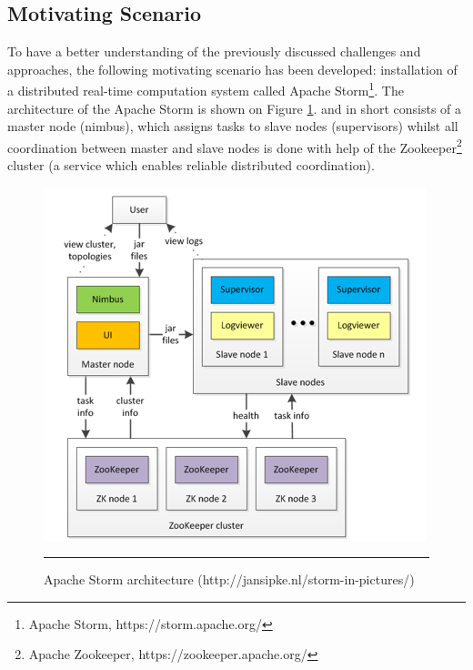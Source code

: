
\subsection{Motivating Scenario}

\noindent To have a better understanding of the previously discussed challenges and approaches, the following motivating scenario has been developed: installation of a distributed real-time computation system called Apache Storm\footnote{ Apache Storm, $  $https://storm.apache.org/}. The architecture of the Apache Storm is shown on Figure \ref{fig:Storm}. and in short consists of a master node (nimbus), which assigns tasks to slave nodes (supervisors) whilst all coordination between master and slave nodes is done with help of the Zookeeper\footnote{ Apache Zookeeper, $  $https://zookeeper.apache.org/} cluster (a service which enables reliable distributed coordination). 

\noindent 

\begin{figure}[htbp]
	\centering
		\includegraphics{./Figures/Storm_architecture}
		\rule{38em}{0.5pt}
	\caption[Storm Architecture]{Apache Storm architecture (http://jansipke.nl/storm-in-pictures/)}
	\label{fig:Storm}
\end{figure}

\noindent

